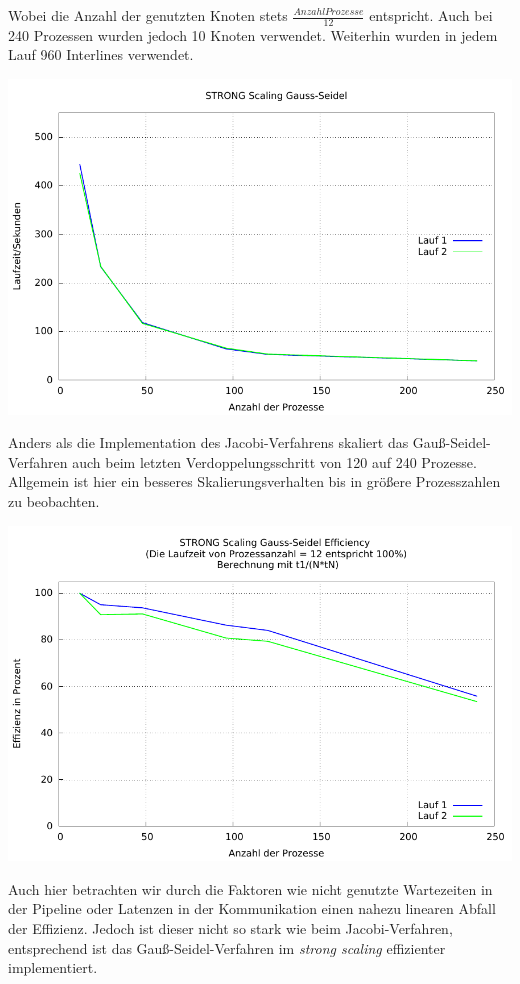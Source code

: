 \documentclass[a4paper]{article}
\begin{document}
Wobei die Anzahl der genutzten Knoten stets $\frac{Anzahl Prozesse}{12}$ entspricht. Auch bei 240 Prozessen wurden jedoch 10 Knoten verwendet. Weiterhin wurden in jedem Lauf 960 Interlines verwendet.

\includegraphics[scale=0.8]{img/STRONG_SCALING_GS_laufzeit.pdf}

Anders als die Implementation des Jacobi-Verfahrens skaliert das Gauß-Seidel-Verfahren auch beim letzten Verdoppelungsschritt von 120 auf 240 Prozesse. Allgemein ist hier ein besseres Skalierungsverhalten bis in größere Prozesszahlen zu beobachten. 

\includegraphics[scale=0.8]{img/STRONG_SCALING_GS_efficiency.pdf}

Auch hier betrachten wir durch die Faktoren wie nicht genutzte Wartezeiten in der Pipeline oder Latenzen in der Kommunikation einen nahezu linearen Abfall der Effizienz. Jedoch ist dieser nicht so stark wie beim Jacobi-Verfahren, entsprechend ist das Gauß-Seidel-Verfahren im \textit{strong scaling} effizienter implementiert.
\end{document}
